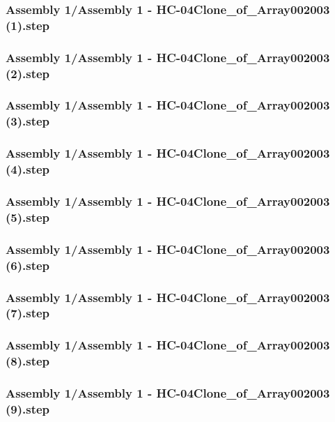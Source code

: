 \documentclass[a4paper,12pt]{article}
\begin{document}
\subsubsection{Assembly 1/Assembly 1 - HC-04Clone_of_Array002003 (1).step}

\subsubsection{Assembly 1/Assembly 1 - HC-04Clone_of_Array002003 (2).step}

\subsubsection{Assembly 1/Assembly 1 - HC-04Clone_of_Array002003 (3).step}

\subsubsection{Assembly 1/Assembly 1 - HC-04Clone_of_Array002003 (4).step}

\subsubsection{Assembly 1/Assembly 1 - HC-04Clone_of_Array002003 (5).step}

\subsubsection{Assembly 1/Assembly 1 - HC-04Clone_of_Array002003 (6).step}

\subsubsection{Assembly 1/Assembly 1 - HC-04Clone_of_Array002003 (7).step}

\subsubsection{Assembly 1/Assembly 1 - HC-04Clone_of_Array002003 (8).step}

\subsubsection{Assembly 1/Assembly 1 - HC-04Clone_of_Array002003 (9).step}

\end{document}

